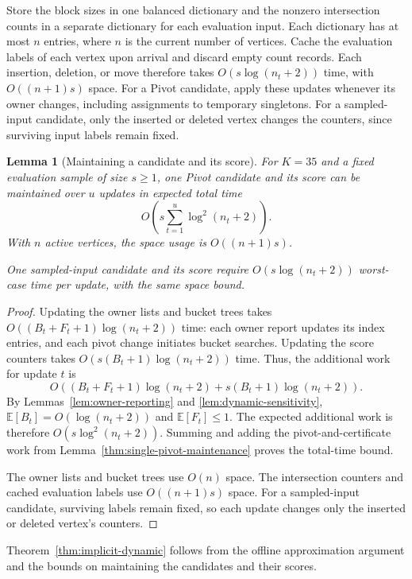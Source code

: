 \documentclass[11pt]{article}
\newtheorem{lemma}[theorem]{Lemma}
\theoremstyle{definition}
\theoremstyle{remark}
\newcommand{\1}{\mathbf{1}}
\begin{document}
Store the block sizes in one balanced dictionary and the nonzero intersection counts in a separate dictionary for each evaluation input. Each dictionary has at most $n$ entries, where $n$ is the current number of vertices. Cache the evaluation labels of each vertex upon arrival and discard empty count records. Each insertion, deletion, or move therefore takes $O(s\log(n_t+2))$ time, with $O((n+1)s)$ space.
For a Pivot candidate, apply these updates whenever its owner changes, including assignments to temporary singletons. For a sampled-input candidate, only the inserted or deleted vertex changes the counters, since surviving input labels remain fixed.

\begin{lemma}[Maintaining a candidate and its score]
\label{lem:candidate-score-maintenance}
For $K=35$ and a fixed evaluation sample of size $s\geq1$, one Pivot candidate and its score can be maintained over $u$ updates in expected total time
\[
    O\!\left(s\sum_{t=1}^{u}\log^2(n_t+2)\right).
\]
With $n$ active vertices, the space usage is $O((n+1)s)$.

One sampled-input candidate and its score require $O(s\log(n_t+2))$ worst-case time per update, with the same space bound.
\end{lemma}

\begin{proof}
Updating the owner lists and bucket trees takes $O((B_t+F_t+1)\log(n_t+2))$ time: each owner report updates its index entries, and each pivot change initiates bucket searches. Updating the score counters takes $O(s(B_t+1)\log(n_t+2))$ time. Thus, the additional work for update $t$ is
\[
    O\!\left(
        (B_t+F_t+1)\log(n_t+2)
        +s(B_t+1)\log(n_t+2)
    \right).
\]
By Lemmas~\ref{lem:owner-reporting} and \ref{lem:dynamic-sensitivity}, $\mathbb E[B_t]=O(\log(n_t+2))$ and $\mathbb E[F_t]\leq1$. The expected additional work is therefore $O(s\log^2(n_t+2))$. Summing and adding the pivot-and-certificate work from Lemma~\ref{thm:single-pivot-maintenance} proves the total-time bound.

The owner lists and bucket trees use $O(n)$ space. The intersection counters and cached evaluation labels use $O((n+1)s)$ space.
For a sampled-input candidate, surviving labels remain fixed, so each update changes only the inserted or deleted vertex's counters.
\end{proof}

Theorem~\ref{thm:implicit-dynamic} follows from the offline approximation
argument and the bounds on maintaining the candidates and their scores.
\end{document}
